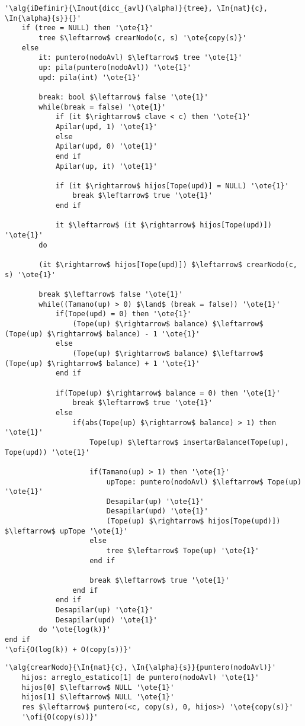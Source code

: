 \begin{lstlisting}[mathescape]
'\alg{iDefinir}{\Inout{dicc_{avl}(\alpha)}{tree}, \In{nat}{c}, \In{\alpha}{s}}{}'
	if (tree = NULL) then '\ote{1}'
		tree $\leftarrow$ crearNodo(c, s) '\ote{copy(s)}'
	else
		it: puntero(nodoAvl) $\leftarrow$ tree '\ote{1}'
		up: pila(puntero(nodoAvl)) '\ote{1}'
		upd: pila(int) '\ote{1}'

		break: bool $\leftarrow$ false '\ote{1}'
		while(break = false) '\ote{1}'
			if (it $\rightarrow$ clave < c)	then '\ote{1}'
			Apilar(upd, 1) '\ote{1}'
			else
			Apilar(upd, 0) '\ote{1}'
			end if
			Apilar(up, it) '\ote{1}'

			if (it $\rightarrow$ hijos[Tope(upd)] = NULL) '\ote{1}'
				break $\leftarrow$ true '\ote{1}'
			end if

			it $\leftarrow$ (it $\rightarrow$ hijos[Tope(upd)]) '\ote{1}'
		do

		(it $\rightarrow$ hijos[Tope(upd)]) $\leftarrow$ crearNodo(c, s) '\ote{1}'

		break $\leftarrow$ false '\ote{1}'
		while((Tamano(up) > 0) $\land$ (break = false)) '\ote{1}'
			if(Tope(upd) = 0) then '\ote{1}'
				(Tope(up) $\rightarrow$ balance) $\leftarrow$ (Tope(up)	$\rightarrow$ balance) - 1 '\ote{1}'
			else
				(Tope(up) $\rightarrow$ balance) $\leftarrow$ (Tope(up)	$\rightarrow$ balance) + 1 '\ote{1}'
			end if

			if(Tope(up) $\rightarrow$ balance = 0) then '\ote{1}'
				break $\leftarrow$ true '\ote{1}'
			else
				if(abs(Tope(up) $\rightarrow$ balance) > 1) then '\ote{1}'
					Tope(up) $\leftarrow$ insertarBalance(Tope(up), Tope(upd)) '\ote{1}'

					if(Tamano(up) > 1) then '\ote{1}'
						upTope: puntero(nodoAvl) $\leftarrow$ Tope(up) '\ote{1}'
						Desapilar(up) '\ote{1}'
						Desapilar(upd) '\ote{1}'
						(Tope(up) $\rightarrow$ hijos[Tope(upd)]) $\leftarrow$ upTope '\ote{1}'
					else
						tree $\leftarrow$ Tope(up) '\ote{1}'
					end if

					break $\leftarrow$ true '\ote{1}'
				end if
			end if
			Desapilar(up) '\ote{1}'
			Desapilar(upd) '\ote{1}'
		do '\ote{log(k)}'
end if
'\ofi{O(log(k)) + O(copy(s))}'
\end{lstlisting}

\begin{lstlisting}[mathescape]
'\alg{crearNodo}{\In{nat}{c}, \In{\alpha}{s}}{puntero(nodoAvl)}'
	hijos: arreglo_estatico[1] de puntero(nodoAvl) '\ote{1}'
	hijos[0] $\leftarrow$ NULL '\ote{1}'
	hijos[1] $\leftarrow$ NULL '\ote{1}'
	res $\leftarrow$ puntero(<c, copy(s), 0, hijos>) '\ote{copy(s)}'
	'\ofi{O(copy(s))}'
\end{lstlisting}

